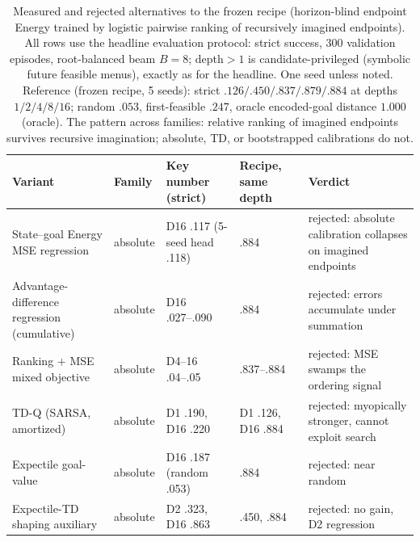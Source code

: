 \begin{table}[t]
\centering
\caption{Measured and rejected alternatives to the frozen recipe
(horizon-blind endpoint Energy trained by logistic pairwise ranking of
recursively imagined endpoints). All rows use the headline evaluation
protocol: strict success, 300 validation episodes, root-balanced beam
$B{=}8$; depth${}>1$ is candidate-privileged (symbolic future feasible
menus), exactly as for the headline. One seed unless noted. Reference
(frozen recipe, 5 seeds): strict $.126/.450/.837/.879/.884$ at depths
$1/2/4/8/16$; random $.053$, first-feasible $.247$, oracle encoded-goal
distance $1.000$ (oracle). The pattern across families: relative ranking
of imagined endpoints survives recursive imagination; absolute, TD, or
bootstrapped calibrations do not.}
\label{tab:negative-results}
\small
\setlength{\tabcolsep}{4pt}
\begin{tabular}{@{}llllp{4.6cm}@{}}
\toprule
Variant & Family & Key number (strict) & Recipe, same depth & Verdict \\
\midrule
State--goal Energy MSE regression & absolute & D16 .117 (5-seed head .118) & .884 & rejected: absolute calibration collapses on imagined endpoints \\
Advantage-difference regression (cumulative) & absolute & D16 .027--.090 & .884 & rejected: errors accumulate under summation \\
Ranking $+$ MSE mixed objective & absolute & D4--16 .04--.05 & .837--.884 & rejected: MSE swamps the ordering signal \\
TD-Q (SARSA, amortized) & absolute & D1 .190, D16 .220 & D1 .126, D16 .884 & rejected: myopically stronger, cannot exploit search \\
Expectile goal-value & absolute & D16 .187 (random .053) & .884 & rejected: near random \\
Expectile-TD shaping auxiliary & absolute & D2 .323, D16 .863 & .450, .884 & rejected: no gain, D2 regression \\

\end{tabular}
\end{table}
